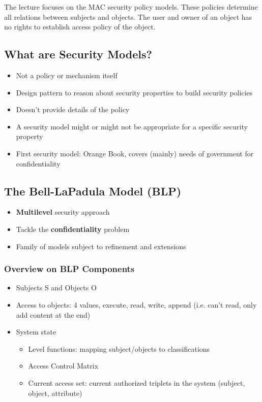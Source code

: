 \documentclass{article}
\newenvironment{myitemize}
{ \begin{itemize}
    \setlength{\itemsep}{005pt}
    \setlength{\parskip}{0pt}
    \setlength{\parsep}{0pt}     }
{ \end{itemize}                  }
\begin{document}
\begin{multicols}{2}
The lecture focuses on the MAC security policy models. These policies determine all relations between subjects and objects. The user and owner of an object has no rights to establish access policy of the object. 

\subsection{What are Security Models?}

\begin{myitemize}
    \item Not a policy or mechanism itself
    \item Design pattern to reason about security properties to build security policies
    \item Doesn't provide details of the policy
    \item A security model might or might not be appropriate for a specific security property
    \item First security model: Orange Book, covers (mainly) needs of government for confidentiality 
\end{myitemize}

\subsection{The Bell-LaPadula Model (BLP)}

\begin{myitemize}
    \item \textbf{Multilevel} security approach
    \item Tackle the \textbf{confidentiality} problem
    \item Family of models subject to refinement and extensions
\end{myitemize}

\subsubsection{Overview on BLP Components}

\begin{myitemize}
    \item Subjects S and Objects O
    \item Access to objects: 4 values, execute, read, write, append (i.e. can't read, only add content at the end)
    \item System state
    \begin{myitemize}
        \item Level functions: mapping subject/objects to classifications
        \item Access Control Matrix
        \item Current access set: current authorized triplets in the system (subject, object, attribute)
    \end{myitemize}
\end{myitemize}


\end{multicols}
\end{document}
